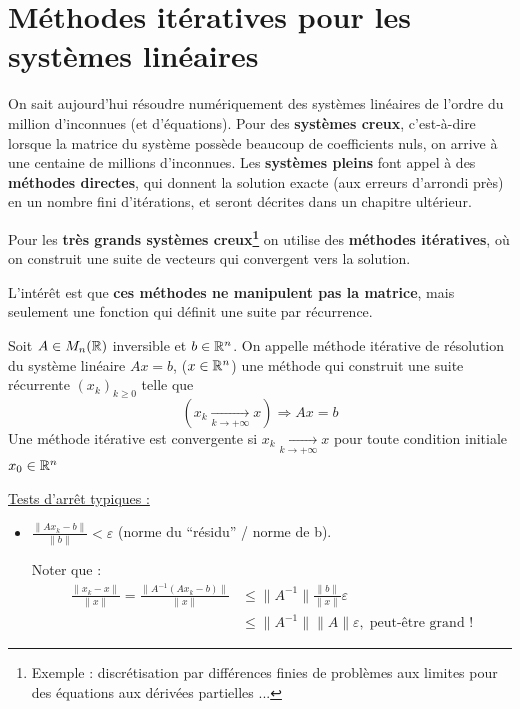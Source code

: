 \chapter{Méthodes itératives pour les systèmes linéaires}

On sait aujourd'hui résoudre numériquement des systèmes linéaires de l'ordre du million d'inconnues (et d'équations). Pour des \textbf{systèmes creux}, c'est-à-dire lorsque la matrice du système possède beaucoup de coefficients nuls, on arrive à une centaine de millions d'inconnues.
Les \textbf{systèmes pleins} font appel à des \textbf{méthodes directes}, qui donnent la solution exacte (aux erreurs d'arrondi près) en un nombre fini d'itérations, et seront décrites dans un chapitre ultérieur.

Pour les \textbf{très grands systèmes creux\footnote{Exemple : discrétisation par différences finies de problèmes aux limites pour des équations aux dérivées partielles ...}}
on utilise des \textbf{méthodes itératives}, où on construit une suite de vecteurs qui convergent vers la solution.

L'intérêt est que \textbf{ces méthodes ne manipulent pas la matrice}, mais seulement une fonction qui définit une suite par récurrence.

\begin{fdef}
    Soit $A \in M_n(\mathbb{R})$ inversible et $b \in \mathbb{R}^n$. On appelle méthode itérative de résolution du système linéaire $Ax=b$, ($x \in \mathbb{R}^n$) 
    une méthode qui construit une suite récurrente $(x_k)_{k\geq0}$
    telle que $$(x_k \underset{k\to +\infty}{\longrightarrow} x) \Rightarrow Ax=b$$
    Une méthode itérative est convergente si $x_k \underset{k\to +\infty}{\longrightarrow}x$ pour toute condition initiale $x_0 \in \mathbb{R}^n$
\end{fdef}

\underline{Tests d'arrêt typiques :}

\renewcommand{\labelitemi}{\textbullet}
\begin{itemize}
    \item $\frac{\|Ax_k - b \|}{\|b\|} < \varepsilon$ (norme du ``résidu'' / norme de b).

        Noter que : 
        \begin{align*} \frac{\|x_k-x\|}{\|x\|} 
            = \frac{\|A^{-1}(Ax_k-b)\|}{\|x\|} 
            & \leq \|A^{-1}\| \frac{\|b\|}{\|x\|}\varepsilon 
            \\ & \leq \|A^{-1}\| \|A\| \varepsilon, 
            \; \mbox{peut-être grand !}\end{align*}

\end{itemize}


